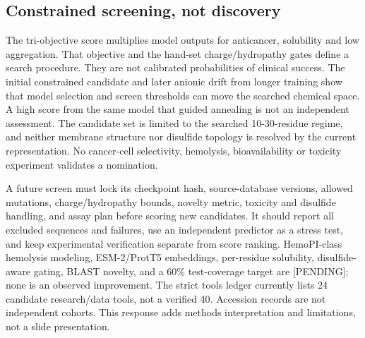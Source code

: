 \hypertarget{constrained-screening-not-discovery}{%
\subsection{Constrained screening, not
discovery}\label{constrained-screening-not-discovery}}

The tri-objective score multiplies model outputs for anticancer,
solubility and low aggregation. That objective and the hand-set
charge/hydropathy gates define a search procedure. They are not
calibrated probabilities of clinical success. The initial constrained
candidate and later anionic drift from longer training show that model
selection and screen thresholds can move the searched chemical space. A
high score from the same model that guided annealing is not an
independent assessment. The candidate set is limited to the searched
10-30-residue regime, and neither membrane structure nor disulfide
topology is resolved by the current representation. No cancer-cell
selectivity, hemolysis, bioavailability or toxicity experiment validates
a nomination.

A future screen must lock its checkpoint hash, source-database versions,
allowed mutations, charge/hydropathy bounds, novelty metric, toxicity
and disulfide handling, and assay plan before scoring new candidates. It
should report all excluded sequences and failures, use an independent
predictor as a stress test, and keep experimental verification separate
from score ranking. HemoPI-class hemolysis modeling, ESM-2/ProtT5
embeddings, per-residue solubility, disulfide-aware gating, BLAST
novelty, and a 60\% test-coverage target are {[}PENDING{]}; none is an
observed improvement. The strict tools ledger currently lists 24
candidate research/data tools, not a verified 40. Accession records are
not independent cohorts. This response adds methods interpretation and
limitations, not a slide presentation.
